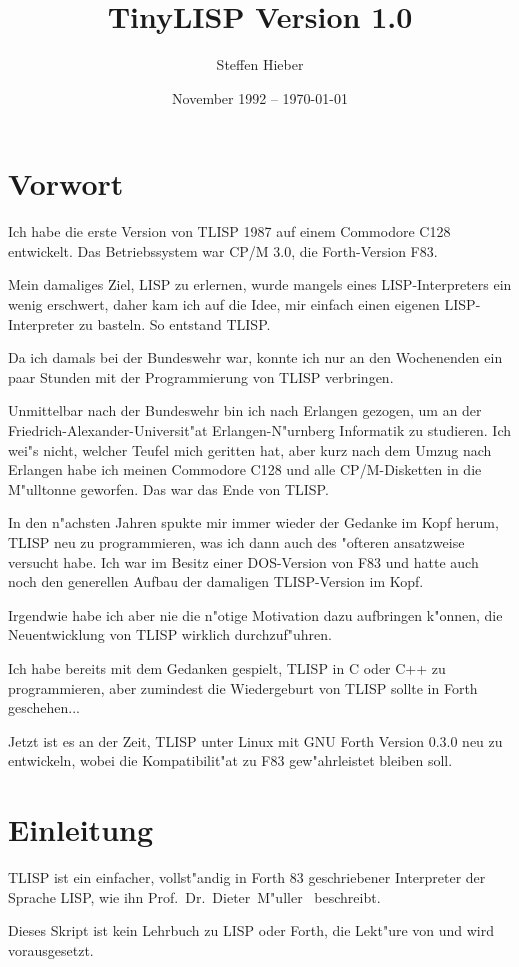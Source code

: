 \documentclass[11pt,a4paper,titlepage]{article}
\title{TinyLISP Version 1.0}
\author{Steffen Hieber}
\date{November 1992 -- \today}
\begin{document}
\maketitle
\tableofcontents
\newpage

\section{Vorwort}
Ich habe die erste Version von TLISP 1987 auf einem Commodore C128 entwickelt. 
Das Betriebssystem war CP/M 3.0, die Forth-Version F83.

Mein damaliges Ziel, LISP zu erlernen, wurde mangels eines LISP-Interpreters
ein wenig erschwert, daher kam ich auf die Idee, mir einfach einen eigenen
LISP-Interpreter zu basteln. So entstand TLISP.

Da ich damals bei der Bundeswehr war, konnte ich nur an den Wochenenden ein
paar Stunden mit der Programmierung von TLISP verbringen.

Unmittelbar nach der Bundeswehr bin ich nach Erlangen gezogen, um an der
Friedrich-Alexander-Universit"at Erlangen-N"urnberg Informatik zu studieren.
Ich wei"s nicht, welcher Teufel mich geritten hat, aber kurz nach dem Umzug
nach Erlangen habe ich meinen Commodore C128 und alle CP/M-Disketten in die
M"ulltonne geworfen. Das war das Ende von TLISP.

In den n"achsten Jahren spukte mir immer wieder der Gedanke im Kopf herum,
TLISP neu zu programmieren, was ich dann auch des "ofteren ansatzweise
versucht habe. Ich war im Besitz einer DOS-Version von F83 und hatte auch
noch den generellen Aufbau der damaligen TLISP-Version im Kopf. 

Irgendwie habe ich aber nie die n"otige Motivation dazu aufbringen k"onnen,
die Neuentwicklung von TLISP wirklich durchzuf"uhren.

Ich habe bereits mit dem Gedanken gespielt, TLISP in C oder C++ zu 
programmieren, aber zumindest die Wiedergeburt von TLISP sollte in Forth
geschehen...

Jetzt ist es an der Zeit, TLISP unter Linux mit GNU Forth Version 0.3.0
neu zu entwickeln, wobei die Kompatibilit"at zu F83 gew"ahrleistet bleiben
soll.

\section{Einleitung}
TLISP ist ein einfacher, vollst"andig in Forth 83 geschriebener Interpreter
der Sprache LISP, wie ihn Prof.~Dr.~Dieter~M"uller~\cite{mu} beschreibt.

Dieses Skript ist kein Lehrbuch zu LISP oder Forth, die Lekt"ure von \cite{mu}
und \cite{ze} wird vorausgesetzt. 

\newpage
\renewcommand{\indexname}{Stichwortverzeichnis}
\addcontentsline{toc}{section}{\indexname}
\printindex

\nocite{*}
\newpage
{}


\end{document}
